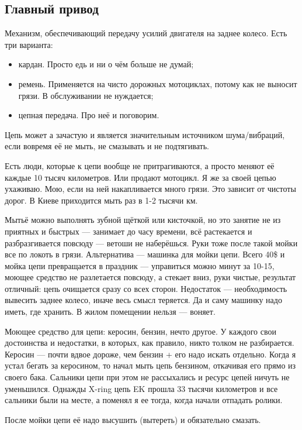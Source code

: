 \documentclass[12pt,a4paper]{article}
\begin{document}
\subsection{Главный привод}

Механизм, обеспечивающий передачу усилий двигателя на заднее колесо. Есть
три варианта:

\begin{itemize}
\item кардан. Просто едь и ни о чём больше не думай;
\item ремень. Применяется на чисто дорожных мотоциклах, потому как не
выносит грязи. В обслуживании не нуждается;
\item цепная передача. Про неё и поговорим.
\end{itemize}

Цепь может а зачастую и является значительным источником шума/вибраций,
если вовремя её не мыть, не смазывать и не подтягивать.

Есть люди, которые к цепи вообще не притрагиваются, а просто меняют
её каждые 10 тысяч километров. Или продают мотоцикл. Я же за своей
цепью ухаживаю. Мою, если на ней накапливается много грязи. Это зависит
от чистоты дорог. В Киеве приходится мыть раз в 1-2 тысячи км.

Мытьё можно выполнять зубной щёткой или кисточкой, но это занятие
не из приятных и быстрых --- занимает до часу времени, всё растекается
и разбразгивается повсюду --- ветоши не наберёшься. Руки тоже после
такой мойки все по локоть в грязи. Альтернатива --- машинка для мойки
цепи. Всего 40\$ и мойка цепи превращается в праздник --- управиться
можно минут за 10-15, моющее средство не разлетается повсюду, а
стекает вниз, руки чистые, результат отличный: цепь очищается сразу
со всех сторон. Недостаток --- необходимость вывесить заднее
колесо, иначе весь смысл теряется. Да и саму машинку надо иметь, где
хранить. В жилом помещении нельзя --- воняет.

Моющее средство для цепи: керосин, бензин, нечто другое. У каждого
свои достоинства и недостатки, в которых, как правило, никто толком
не разбирается. Керосин --- почти вдвое дороже, чем
бензин + его надо искать отдельно. Когда я устал бегать за керосином,
то начал мыть цепь бензином, откачивая его прямо из своего бака.
Сальники цепи при этом не рассыхались и ресурс цепей ничуть не
уменьшился. Однажды X-ring цепь EK прошла 33 тысячи километров и
все сальники были на месте, а поменял я ее тогда, когда начали
отпадать ролики.

После мойки цепи её надо высушить (вытереть) и обязательно смазать.
\end{document}
